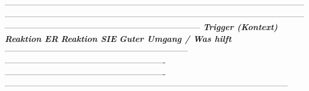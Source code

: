 {{{{-----------------------------------------------------------------------------------------------------------------------------------------------------------------------------------------------------------------------------------------------------------------------------------------------
\textbf{\textit{\textcolor{ctmmRed}{Trigger} (Kontext)}}                                            \textbf{\textit{Reaktion ER}}                                          \textbf{\textit{Reaktion SIE}}                                         \textbf{\textit{Guter Umgang / Was hilft}}
------------------------------------------------------------------ ---------------------------------------------------------- ---------------------------------------------------------- ------------------------------------------------------------------------------------------------------
\textcolor{ctmmBlue}{}                                                                 \textcolor{ctmmBlue}{}                                                         \textcolor{ctmmBlue}{}                                                         \textcolor{ctmmBlue}{}
}}}}
